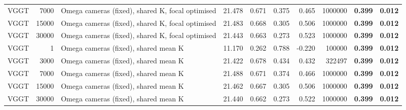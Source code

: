 \begin{table}[H]
\begin{tabular}{lrlrrrrrrr}
VGGT & 7000 & Omega cameras (fixed), shared K, focal optimised & 21.478 & 0.671 & 0.375 & 0.465 & 1000000 & \textbf{0.399} & \textbf{0.012} \\
VGGT & 15000 & Omega cameras (fixed), shared K, focal optimised & 21.483 & 0.668 & 0.305 & 0.506 & 1000000 & \textbf{0.399} & \textbf{0.012} \\
VGGT & 30000 & Omega cameras (fixed), shared K, focal optimised & 21.443 & 0.663 & 0.273 & 0.523 & 1000000 & \textbf{0.399} & \textbf{0.012} \\
VGGT & 1 & Omega cameras (fixed), shared mean K & 11.170 & 0.262 & 0.788 & -0.220 & 100000 & \textbf{0.399} & \textbf{0.012} \\
VGGT & 3000 & Omega cameras (fixed), shared mean K & 21.422 & 0.678 & 0.434 & 0.432 & 322497 & \textbf{0.399} & \textbf{0.012} \\
VGGT & 7000 & Omega cameras (fixed), shared mean K & 21.488 & 0.671 & 0.374 & 0.466 & 1000000 & \textbf{0.399} & \textbf{0.012} \\
VGGT & 15000 & Omega cameras (fixed), shared mean K & 21.462 & 0.667 & 0.305 & 0.506 & 1000000 & \textbf{0.399} & \textbf{0.012} \\
VGGT & 30000 & Omega cameras (fixed), shared mean K & 21.440 & 0.662 & 0.273 & 0.522 & 1000000 & \textbf{0.399} & \textbf{0.012} \\
\bottomrule
\end{tabular}
\end{table}